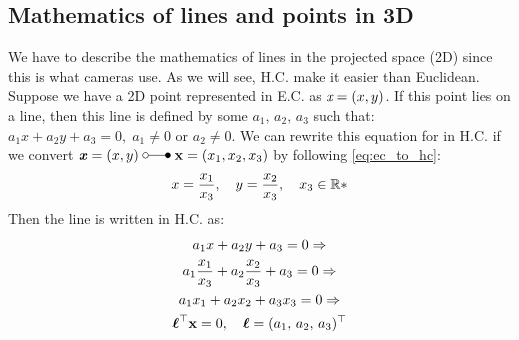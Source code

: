 \documentclass[a4paper]{article}
\begin{document}
\subsection{Mathematics of lines and points in 3D}

We have to describe the mathematics of lines in the projected space (2D) since this is what cameras use. As we will see, H.C. make it easier than Euclidean. Suppose we have a 2D point represented in E.C. as $\textit{\textit{x}} = (x,y)$. If this point lies on a line, then this line is defined by some $a_1,\, a_2,\, a_3$ such that: $a_1x + a_2y + a_3 = 0, \; a_1 \neq 0$ or $a_2\neq 0$. We can rewrite this equation for in H.C. if we convert $\textbf{\textit{x}} = (x,y) \; \laplace \;  \textbf{\textup{x}} = (x_1,x_2,x_3)$ by following \eqref{eq:ec_to_hc}:
\[
x = \frac{x_1}{x_3}, \quad y = \frac{x_2}{x_3}, \quad x_3\in \mathbb{R}*
\]
Then the line is written in H.C. as:
\begin{gather}
    a_1x + a_2y + a_3 = 0 \Rightarrow \nonumber \\
    a_1 \frac{x_1}{x_3} + a_2 \frac{x_2}{x_3} + a_3 = 0 \Rightarrow \nonumber \\
    a_1 x_1 + a_2 x_2 + a_3 x_3 = 0 \Rightarrow \nonumber \\
    \boldsymbol{\ell}^{\top} \textbf{\textup{x}} = 0, \quad \boldsymbol{\ell} = (a_1,\, a_2,\, a_3)^{\top} \nonumber
\end{gather}
\end{document}
